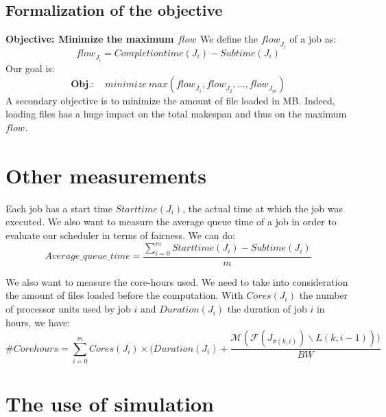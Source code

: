\documentclass[a4paper]{article}
\newtheorem{definition}{Definition}
\newcommand{\flow}[1]{\ensuremath{\mathit{flow}_{#1}}\xspace}
\newcommand{\inputs}{\ensuremath{\mathcal{F}}\xspace}
\newcommand{\memory}{\ensuremath{\mathcal{M}}\xspace}
\newcommand{\duration}{\mathit{Duration}\xspace}
\newcommand{\bandwidth}{\mathit{BW}\xspace}
\newcommand{\core}{\mathit{Cores}\xspace}
\newcommand{\submissiontime}{\mathit{Subtime}\xspace}
\newcommand{\completiontime}{\mathit{Completiontime}\xspace}
\newcommand{\start}{\mathit{Starttime}\xspace}
\newcommand{\evict}{\ensuremath{\mathcal{V}}\xspace}
\newcommand{\nbloads}{\ensuremath{\mathit{\mathit{Loads}}}\xspace}
\newcommand{\live}{\ensuremath{L}\xspace}
\begin{document}


\subsection{Formalization of the objective}
\textbf{Objective: Minimize the maximum \flow{}}
		We define the \flow{J_i} of a job as:
		$$
			\flow{J_i} = \completiontime(J_i) - \submissiontime(J_i)
		$$
		Our goal is:
		$$
			\textbf{Obj.}: \quad \mathit{minimize}~\mathit{max}(\flow{J_1}, \flow{J_2}, ..., \flow{J_m})
		$$
A secondary objective is to minimize the amount of file loaded in MB.
Indeed, loading files has a huge impact on the total makespan and thus on the maximum \flow{}.

\section{Other measurements}

Each job has a start time $\start(J_i)$, the actual time at which the job was executed.
We also want to measure the average queue time of a job in order
to evaluate our scheduler in terms of fairness. We can do:
$$
	Average\_queue\_time = \frac{\sum^{m}_{i = 0} \start(J_i) - \submissiontime(J_i)}{m}
$$

We also want to measure the core-hours used. We need to take into consideration the amount of files loaded before the computation.
With $\core(J_i)$ the number of processor units used by job $i$ and $\duration(J_i)$ the duration of job $i$ in hours, we have:
$$
	\#Corehours = \sum^{m}_{i = 0} \core(J_i) \times (\duration(J_i) + \frac{\memory(\inputs\left(J_{\sigma(k,i)}\right) \backslash \live(k,i-1)))}{\bandwidth}
$$

\section{The use of simulation}
\end{document}
